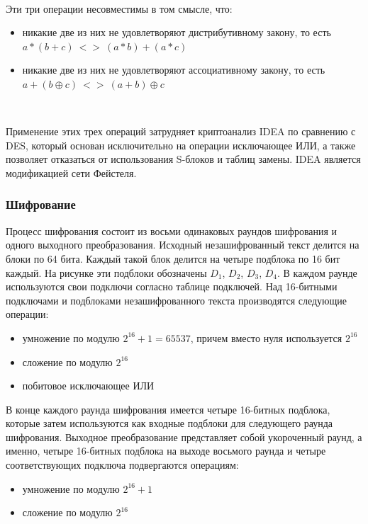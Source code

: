 \documentclass[a4paper]{report}
\begin{document}
~

Эти три операции несовместимы в том смысле, что:
\begin{itemize}
\item никакие две из них не удовлетворяют дистрибутивному закону, то есть \\ $a*(b+c)\ <>\ (a*b)+(a*c)$
\item никакие две из них не удовлетворяют ассоциативному закону, то есть \\ $a+(b\oplus c)\ <>\ (a+b)\oplus c$
\end{itemize}

~

Применение этих трех операций затрудняет криптоанализ IDEA по сравнению с DES, который основан исключительно на операции исключающее ИЛИ, а также позволяет отказаться от использования S-блоков и таблиц замены. IDEA является модификацией сети Фейстеля.

\subsubsection{Шифрование}

Процесс шифрования состоит из восьми одинаковых раундов шифрования и одного выходного преобразования. Исходный незашифрованный текст делится на блоки по 64 бита. Каждый такой блок делится на четыре подблока по 16 бит каждый. На рисунке эти подблоки обозначены $D_{1}$, $D_{2}$, $D_{3}$, $D_{4}$. В каждом раунде используются свои подключи согласно таблице подключей. Над 16-битными подключами и подблоками незашифрованного текста производятся следующие операции:



\begin{itemize}
\item умножение по модулю $2^{16}+1 = 65537$, причем вместо нуля используется $2^{16}$
\item сложение по модулю $2^{16}$
\item побитовое исключающее ИЛИ
\end{itemize}

В конце каждого раунда шифрования имеется четыре 16-битных подблока, которые затем используются как входные подблоки для следующего раунда шифрования. Выходное преобразование представляет собой укороченный раунд, а именно, четыре 16-битных подблока на выходе восьмого раунда и четыре соответствующих подключа подвергаются операциям:

\begin{itemize}
\item умножение по модулю $2^{16}+1$
\item сложение по модулю $2^{16}$
\end{itemize}
\end{document}
